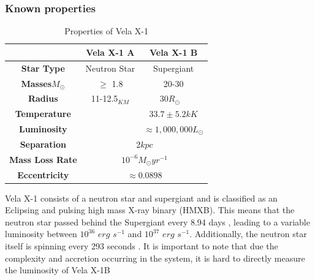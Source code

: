 \documentclass[12pt, a4paper]{article}
\begin{document}
    \begin{table} [H]
            \subsubsection{Known properties}
            \begin{center}
                \begin{tabular}{||c || c | c||}
                 \hline
                 & Vela X-1 A & Vela X-1 B  \\ 
                 \hline\hline
                 \textbf{Star Type} & Neutron Star & Supergiant \parencite{Kretschmar_2021} \\ 
                 \hline
                 \textbf{Masses}\(M_\odot\) & $\ge$ 1.8 \parencite{Kretschmar_2021} & 20-30 \parencite{Kretschmar_2021} \\
                 \hline
                 \textbf{Radius} & 11-12.5$_{KM}$ \parencite{Kretschmar_2021} & 30\(R_\odot\)
                ~\parencite{Kretschmar_2021} \\
                 \hline 
                 \textbf{Temperature} &  & $33.7 \pm 5.2 kK$ \parencite{Kretschmar_2021}\\ 
                 \hline
                 \textbf{Luminosity} & & $\approx 1,000,000 L_{\odot}$ \parencite{Kretschmar_2021} \\
                 \hline
                 \textbf{Separation} & \multicolumn{2}{c||}{2$kpc$ \parencite{Kretschmar_2021}} \\
                 \hline 
                 \textbf{Mass Loss Rate} & \multicolumn{2}{c||}{$10^{-6} M_\odot yr^{-1}$ \parencite{Kretschmar_2021}} \\
                 \hline
                 \textbf{Eccentricity} & \multicolumn{2}{c||}{$ \approx  0.0898$ \parencite{Kretschmar_2021}} \\
                 \hline
                \end{tabular}
                \caption{Properties of Vela X-1} 
                \label{VelaX1Table} 

            \end{center}
    \end{table}

        Vela X-1 consists of a neutron star and supergiant and is classified as an Eclipsing and pulsing high mass X-ray binary (HMXB). This means that the neutron star passed behind the Supergiant every 8.94 days \parencite{Falanga_2015}, leading to a variable luminosity between $10^{36}$ $erg$ $s^{-1}$ and $10^{37}$ $erg$ $s^{-1}$. Additionally, the neutron star itself is spinning every 293 seconds \parencite{Kretschmar_2021}. It is important to note that due the complexity and accretion occurring in the system, it is hard to directly measure the luminosity of Vela X-1B
        
\end{document}
